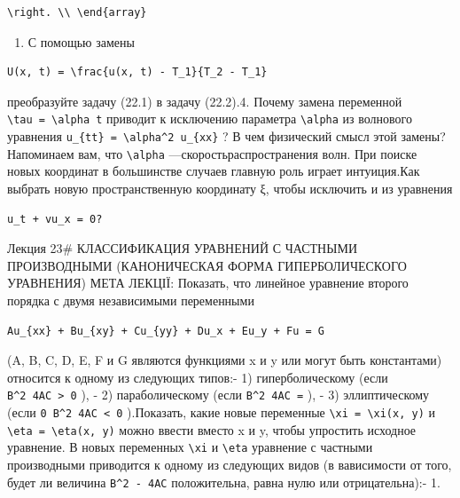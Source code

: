\documentclass[
  ukrainian,
]{article}
\providecommand{\tightlist}{%
  \setlength{\itemsep}{0pt}\setlength{\parskip}{0pt}}
\begin{document}
\begin{verbatim}
\right. \\ \end{array}
\end{verbatim}

\begin{enumerate}
\def\labelenumi{\arabic{enumi}.}
\setcounter{enumi}{2}
\tightlist
\item
  С помощью замены
\end{enumerate}

\begin{verbatim}
U(x, t) = \frac{u(x, t) - T_1}{T_2 - T_1}
\end{verbatim}

преобразуйте задачу (22.1) в задачу (22.2).4. Почему замена переменной
\texttt{\textbackslash{}tau\ =\ \textbackslash{}alpha\ t} приводит к
исключению параметра \texttt{\textbackslash{}alpha} из волнового
уравнения \texttt{u\_\{tt\}\ =\ \textbackslash{}alpha\^{}2\ u\_\{xx\}} ?
В чем физический смысл этой замены? Напоминаем вам, что
\texttt{\textbackslash{}alpha} ---скоростьраспространения волн. При
поиске новых координат в большинстве случаев главную роль играет
интуиция.Как выбрать новую пространственную координату ξ, чтобы
исключить и из уравнения

\begin{verbatim}
u_t + vu_x = 0?
\end{verbatim}

Лекция 23\# КЛАССИФИКАЦИЯ УРАВНЕНИЙ С ЧАСТНЫМИ ПРОИЗВОДНЫМИ
(КАНОНИЧЕСКАЯ ФОРМА ГИПЕРБОЛИЧЕСКОГО УРАВНЕНИЯ) МЕТА ЛЕКЦІЇ: Показать,
что линейное уравнение второго порядка с двумя независимыми переменными

\begin{verbatim}
Au_{xx} + Bu_{xy} + Cu_{yy} + Du_x + Eu_y + Fu = G
\end{verbatim}

(A, B, C, D, E, F и G являются функциями x и y или могут быть
константами) относится к одному из следующих типов:- 1) гиперболическому
(если \texttt{B\^{}2\ 4AC\ \textgreater{}\ 0} ), - 2) параболическому
(если \texttt{B\^{}2\ 4AC\ =} ), - 3) эллиптическому (если
\texttt{0\ B\^{}2\ 4AC\ \textless{}\ 0} ).Показать, какие новые
переменные \texttt{\textbackslash{}xi\ =\ \textbackslash{}xi(x,\ y)} и
\texttt{\textbackslash{}eta\ =\ \textbackslash{}eta(x,\ y)} можно ввести
вместо x и y, чтобы упростить исходное уравнение. В новых переменных
\texttt{\textbackslash{}xi} и \texttt{\textbackslash{}eta} уравнение с
частными производными приводится к одному из следующих видов (в
вависимости от того, будет ли величина \texttt{B\^{}2\ -\ 4AC}
положительна, равна нулю или отрицательна):- 1.
\end{document}
